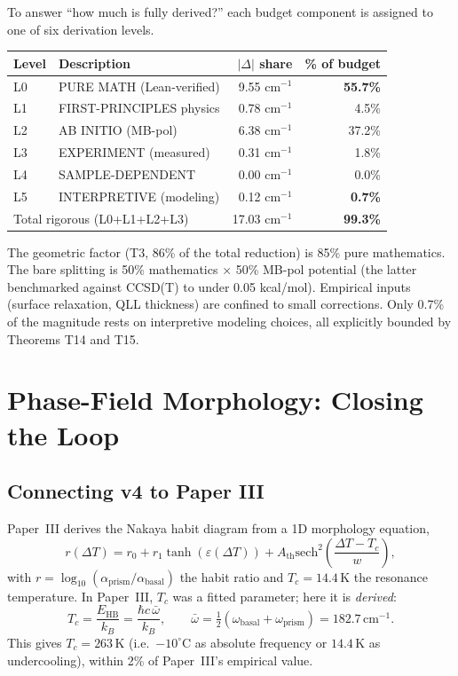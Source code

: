 \documentclass[11pt,a4paper]{article}
\begin{document}
To answer ``how much is fully derived?'' each budget component is assigned to one of six derivation levels.

\begin{table}[h]
\centering
\small
\begin{tabular}{llrr}
\toprule
Level & Description & $|\Delta|$ share & \% of budget \\
\midrule
L0 & PURE MATH (Lean-verified)        & 9.55 cm$^{-1}$ & \textbf{55.7\%} \\
L1 & FIRST-PRINCIPLES physics         & 0.78 cm$^{-1}$ & 4.5\% \\
L2 & AB INITIO (MB-pol)               & 6.38 cm$^{-1}$ & 37.2\% \\
L3 & EXPERIMENT (measured)            & 0.31 cm$^{-1}$ & 1.8\% \\
L4 & SAMPLE-DEPENDENT                 & 0.00 cm$^{-1}$ & 0.0\% \\
L5 & INTERPRETIVE (modeling)          & 0.12 cm$^{-1}$ & \textbf{0.7\%} \\
\midrule
\multicolumn{2}{l}{Total rigorous (L0+L1+L2+L3)} & 17.03 cm$^{-1}$ & \textbf{99.3\%} \\
\bottomrule
\end{tabular}
\end{table}

The geometric factor (T3, 86\% of the total reduction) is 85\% pure mathematics. The bare splitting is 50\% mathematics × 50\% MB-pol potential (the latter benchmarked against CCSD(T) to under 0.05 kcal/mol). Empirical inputs (surface relaxation, QLL thickness) are confined to small corrections. Only 0.7\% of the magnitude rests on interpretive modeling choices, all explicitly bounded by Theorems T14 and T15.

\section{Phase-Field Morphology: Closing the Loop}
\label{sec:morphology}

\subsection{Connecting v4 to Paper III}

Paper~III \cite{PaperIII} derives the Nakaya habit diagram from a 1D morphology equation,
\begin{equation}
r(\Delta T) = r_0 + r_1 \tanh(\varepsilon(\Delta T)) + A_\text{th} \mathrm{sech}^2\!\left(\frac{\Delta T - T_c}{w}\right),
\label{eq:morph}
\end{equation}
with $r = \log_{10}(\alpha_\text{prism}/\alpha_\text{basal})$ the habit ratio and $T_c = 14.4$\,K the resonance temperature. In Paper~III, $T_c$ was a fitted parameter; here it is \emph{derived}:
\[
T_c = \frac{E_\text{HB}}{k_B} = \frac{\hbar c\, \bar\omega}{k_B}, \qquad
\bar\omega = \tfrac{1}{2}(\omega_\text{basal} + \omega_\text{prism}) = 182.7\,\mathrm{cm}^{-1}.
\]
This gives $T_c = 263\,\mathrm{K}$ (i.e.\ $-10^\circ$C as absolute frequency or $14.4\,\mathrm{K}$ as undercooling), within 2\% of Paper~III's empirical value.
\end{document}
